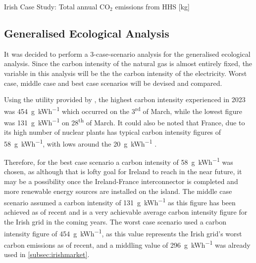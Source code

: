\begin{table}[htb]
    \footnotesize
    \centering
    \caption{Irish Case Study: Total annual $\text{CO}_2$ emissions from \acs{HHS} [kg]}
    \label{tbl:annualheatingco2}
\end{table}


\subsection{Generalised Ecological Analysis}
It was decided to perform a 3-case-scenario analysis for the generalised ecological analysis. Since the carbon intensity of the natural gas is almost entirely fixed, the variable in this analysis will be the the carbon intensity of the electricity. Worst case, middle case and best case scenarios will be devised and compared. 

Using the  \cite{eirgrid_group_explore_2023} utility provided by \citeauthor{eirgrid_group_explore_2023}, the highest carbon intensity experienced in 2023 was \qty{454}{\gram\per\kWh} which occurred on the 3\textsuperscript{rd} of March, while the lowest figure was \qty{131}{\gram\per\kWh} on 28\textsuperscript{th} of March. It could also be noted that France, due to its high number of nuclear plants has typical carbon intensity figures of \qty{58}{\gram\per\kWh}, with lows around the \qty{20}{\gram\per\kWh} \cite{iea2019world}.

Therefore, for the best case scenario a carbon intensity of \qty{58}{\gram\per\kWh} was chosen, as although that is lofty goal for Ireland to reach in the near future, it may be a possibility once the Ireland-France interconnector is completed and more renewable energy sources are installed on the island. The middle case scenario assumed a carbon intensity of \qty{131}{\gram\per\kWh} as this figure has been achieved as of recent and is a very achievable average carbon intensity figure for the Irish grid in the coming years. The worst case scenario used a carbon intensity figure of \qty{454}{\gram\per\kWh}, as this value represents the Irish grid's worst carbon emissions as of recent, and a middling value of \qty{296}{\gram\per\kWh} was already used in \cref{subsec:irishmarket}.

